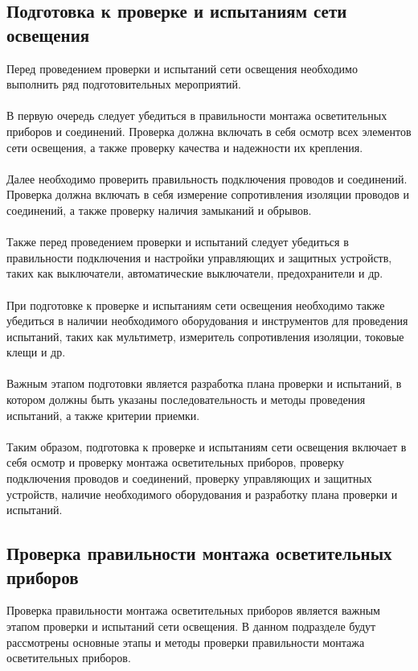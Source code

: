 \documentclass{article}
\begin{document}
\subsection{Подготовка к проверке и испытаниям сети освещения}
Перед проведением проверки и испытаний сети освещения необходимо выполнить ряд подготовительных мероприятий.\\
~\\
В первую очередь следует убедиться в правильности монтажа осветительных приборов и соединений. Проверка должна включать в себя осмотр всех элементов сети освещения, а также проверку качества и надежности их крепления.\\
~\\
Далее необходимо проверить правильность подключения проводов и соединений. Проверка должна включать в себя измерение сопротивления изоляции проводов и соединений, а также проверку наличия замыканий и обрывов.\\
~\\
Также перед проведением проверки и испытаний следует убедиться в правильности подключения и настройки управляющих и защитных устройств, таких как выключатели, автоматические выключатели, предохранители и др.\\
~\\
При подготовке к проверке и испытаниям сети освещения необходимо также убедиться в наличии необходимого оборудования и инструментов для проведения испытаний, таких как мультиметр, измеритель сопротивления изоляции, токовые клещи и др.\\
~\\
Важным этапом подготовки является разработка плана проверки и испытаний, в котором должны быть указаны последовательность и методы проведения испытаний, а также критерии приемки.\\
~\\
Таким образом, подготовка к проверке и испытаниям сети освещения включает в себя осмотр и проверку монтажа осветительных приборов, проверку подключения проводов и соединений, проверку управляющих и защитных устройств, наличие необходимого оборудования и разработку плана проверки и испытаний.
\subsection{Проверка правильности монтажа осветительных приборов}
Проверка правильности монтажа осветительных приборов является важным этапом проверки и испытаний сети освещения. В данном подразделе будут рассмотрены основные этапы и методы проверки правильности монтажа осветительных приборов.
\end{document}
